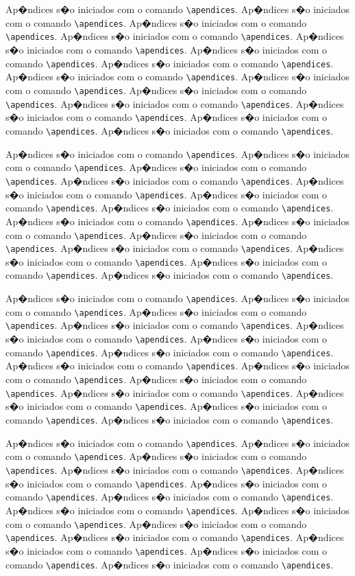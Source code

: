 Ap�ndices s�o iniciados com o comando \verb|\apendices|.
Ap�ndices s�o iniciados com o comando \verb|\apendices|.
Ap�ndices s�o iniciados com o comando \verb|\apendices|.
Ap�ndices s�o iniciados com o comando \verb|\apendices|.
Ap�ndices s�o iniciados com o comando \verb|\apendices|.
Ap�ndices s�o iniciados com o comando \verb|\apendices|.
Ap�ndices s�o iniciados com o comando \verb|\apendices|.
Ap�ndices s�o iniciados com o comando \verb|\apendices|.
Ap�ndices s�o iniciados com o comando \verb|\apendices|.
Ap�ndices s�o iniciados com o comando \verb|\apendices|.
Ap�ndices s�o iniciados com o comando \verb|\apendices|.
Ap�ndices s�o iniciados com o comando \verb|\apendices|.
Ap�ndices s�o iniciados com o comando \verb|\apendices|.
Ap�ndices s�o iniciados com o comando \verb|\apendices|.

Ap�ndices s�o iniciados com o comando \verb|\apendices|.
Ap�ndices s�o iniciados com o comando \verb|\apendices|.
Ap�ndices s�o iniciados com o comando \verb|\apendices|.
Ap�ndices s�o iniciados com o comando \verb|\apendices|.
Ap�ndices s�o iniciados com o comando \verb|\apendices|.
Ap�ndices s�o iniciados com o comando \verb|\apendices|.
Ap�ndices s�o iniciados com o comando \verb|\apendices|.
Ap�ndices s�o iniciados com o comando \verb|\apendices|.
Ap�ndices s�o iniciados com o comando \verb|\apendices|.
Ap�ndices s�o iniciados com o comando \verb|\apendices|.
Ap�ndices s�o iniciados com o comando \verb|\apendices|.
Ap�ndices s�o iniciados com o comando \verb|\apendices|.
Ap�ndices s�o iniciados com o comando \verb|\apendices|.
Ap�ndices s�o iniciados com o comando \verb|\apendices|.

Ap�ndices s�o iniciados com o comando \verb|\apendices|.
Ap�ndices s�o iniciados com o comando \verb|\apendices|.
Ap�ndices s�o iniciados com o comando \verb|\apendices|.
Ap�ndices s�o iniciados com o comando \verb|\apendices|.
Ap�ndices s�o iniciados com o comando \verb|\apendices|.
Ap�ndices s�o iniciados com o comando \verb|\apendices|.
Ap�ndices s�o iniciados com o comando \verb|\apendices|.
Ap�ndices s�o iniciados com o comando \verb|\apendices|.
Ap�ndices s�o iniciados com o comando \verb|\apendices|.
Ap�ndices s�o iniciados com o comando \verb|\apendices|.
Ap�ndices s�o iniciados com o comando \verb|\apendices|.
Ap�ndices s�o iniciados com o comando \verb|\apendices|.
Ap�ndices s�o iniciados com o comando \verb|\apendices|.
Ap�ndices s�o iniciados com o comando \verb|\apendices|.

Ap�ndices s�o iniciados com o comando \verb|\apendices|.
Ap�ndices s�o iniciados com o comando \verb|\apendices|.
Ap�ndices s�o iniciados com o comando \verb|\apendices|.
Ap�ndices s�o iniciados com o comando \verb|\apendices|.
Ap�ndices s�o iniciados com o comando \verb|\apendices|.
Ap�ndices s�o iniciados com o comando \verb|\apendices|.
Ap�ndices s�o iniciados com o comando \verb|\apendices|.
Ap�ndices s�o iniciados com o comando \verb|\apendices|.
Ap�ndices s�o iniciados com o comando \verb|\apendices|.
Ap�ndices s�o iniciados com o comando \verb|\apendices|.
Ap�ndices s�o iniciados com o comando \verb|\apendices|.
Ap�ndices s�o iniciados com o comando \verb|\apendices|.
Ap�ndices s�o iniciados com o comando \verb|\apendices|.
Ap�ndices s�o iniciados com o comando \verb|\apendices|.

